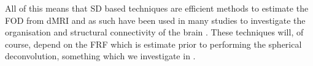 All of this means that \ac{SD} based techniques are efficient methods to estimate the \ac{FOD} from \ac{dMRI} and as such have been used in many studies to investigate the organisation and structural connectivity of the brain \cite{DellAcqua2019,Schilling2019,Raffelt2012,Tournier2007,Tournier2004,Schilling2019b,Maier-Hein2017,Neher2014a,Jbabdi2011}.
These techniques will, of course, depend on the \ac{FRF} which is estimate prior to performing the spherical deconvolution, something which we investigate in . 

